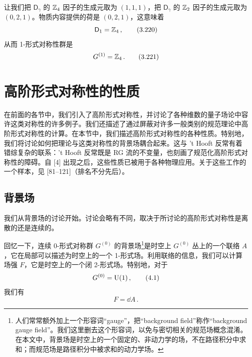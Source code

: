 

让我们把 $\mathsf{D}_\gamma$ 的 $\mathbb{Z}_4$ 因子的生成元取为 $(1,1,1)$，把 $\mathsf{D}_\gamma$ 的 $\mathbb{Z}_2$ 因子的生成元取为 $(0,2,1)$。物质内容提供的荷是 $(0,2,1)$，这意味着
\begin{equation}
    \mathsf{D}_1 = \mathbb{Z}_4 \,,
    \tag{3.220}
\end{equation}
从而 1-形式对称性群是
\begin{equation}
    G^{(1)} = \mathbb{Z}_4 \,.
    \tag{3.221}
\end{equation}

\section{高阶形式对称性的性质}

在前面的各节中，我们引入了高阶形式对称性，并讨论了各种维数的量子场论中容许这类对称性的许多例子。我们还描述了通过屏蔽对许多一般类别的规范理论中高阶形式对称性的计算。在本节中，我们描述高阶形式对称性的各种性质。特别地，我们将讨论如何把理论与这类对称性的背景场耦合起来。这与 't Hooft 反常有着错综复杂的联系：'t Hooft 反常既是 RG 流的不变量，也刻画了规范化高阶形式对称性的障碍。自 [4] 出现之后，这些性质已被用于各种物理应用。关于这些工作的一个样本，见 [81--121]（排名不分先后）。

\subsection{背景场}

我们从背景场的讨论开始。讨论会略有不同，取决于所讨论的高阶形式对称性是离散的还是连续的。

回忆一下，连续 0-形式对称群 $G^{(0)}$ 的背景场\footnote{人们常常额外加上一个形容词“gauge”，把“background field”称作“background gauge field”。我们这里删去这个形容词，以免与密切相关的规范场概念混淆。在本文中，背景场是时空上的一个固定的、非动力学的场，不在路径积分中求和；而规范场是路径积分中被求和的动力学场。}是时空上 $G^{(0)}$ 丛上的一个联络 $A$，它在局部可以描述为时空上的一个 1-形式场。利用联络的信息，我们可以计算场强 $F$，它是时空上的一个闭 2-形式场。特别地，对于
\begin{equation}
    G^{(0)} = \mathrm{U}(1) \,,
    \tag{4.1}
\end{equation}
我们有
\begin{equation}
    F = \dd A \,.
    \tag{4.2}
\end{equation}


